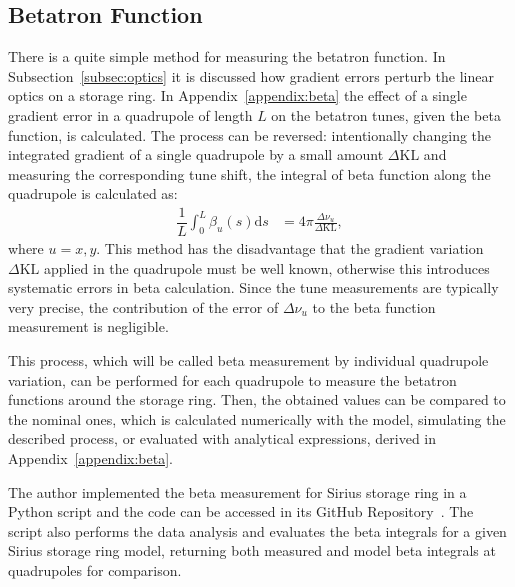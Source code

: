 \subsection{Betatron Function}
There is a quite simple method for measuring the betatron function. In Subsection~\ref{subsec:optics} it is discussed how gradient errors perturb the linear optics on a storage ring. In Appendix~\ref{appendix:beta} the effect of a single gradient error in a quadrupole of length $L$ on the betatron tunes, given the beta function, is calculated. The process can be reversed: intentionally changing the integrated gradient of a single quadrupole by a small amount $\Delta \mathrm{KL}$ and measuring the corresponding tune shift, the integral of beta function along the quadrupole is calculated as:
\begin{align}
\dfrac{1}{L}\int_{0}^{L} \beta_u(s) \mathrm{d}s &= 4\pi\frac{\Delta \nu_u}{\Delta \mathrm{KL}},
\end{align}
where $u=x, y$. This method has the disadvantage that the gradient variation $\Delta \mathrm{KL}$ applied in the quadrupole must be well known, otherwise this introduces systematic errors in beta calculation. Since the tune measurements are typically very precise, the contribution of the error of $\Delta \nu_u$ to the beta function measurement is negligible.

This process, which will be called beta measurement by individual quadrupole variation, can be performed for each quadrupole to measure the betatron functions around the storage ring. Then, the obtained values can be compared to the nominal ones, which is calculated numerically with the model, simulating the described process, or evaluated with analytical expressions, derived in Appendix~\ref{appendix:beta}.

The author implemented the beta measurement for Sirius storage ring in a Python script and the code can be accessed in its GitHub Repository~\cite{betasirius}. The script also performs the data analysis and evaluates the beta integrals for a given Sirius storage ring model, returning both measured and model beta integrals at quadrupoles for comparison.

